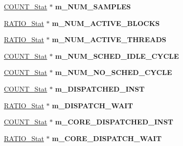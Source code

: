 \begin{DoxyCompactItemize}
\item 
\hypertarget{classall__stats__c_a894e805c8c68b2359cfa3eb3fd7ef468}{
\hyperlink{classCOUNT__Stat}{COUNT\_\-Stat} $\ast$ {\bfseries m\_\-NUM\_\-SAMPLES}}
\label{classall__stats__c_a894e805c8c68b2359cfa3eb3fd7ef468}

\item 
\hypertarget{classall__stats__c_a3366b919ccf4d52b52426aeb33c5e3c9}{
\hyperlink{classRATIO__Stat}{RATIO\_\-Stat} $\ast$ {\bfseries m\_\-NUM\_\-ACTIVE\_\-BLOCKS}}
\label{classall__stats__c_a3366b919ccf4d52b52426aeb33c5e3c9}

\item 
\hypertarget{classall__stats__c_a7de51a79b8407b4cf35d9731ea250818}{
\hyperlink{classRATIO__Stat}{RATIO\_\-Stat} $\ast$ {\bfseries m\_\-NUM\_\-ACTIVE\_\-THREADS}}
\label{classall__stats__c_a7de51a79b8407b4cf35d9731ea250818}

\item 
\hypertarget{classall__stats__c_affa7ab6f09b749f1565b200a6fcb50c7}{
\hyperlink{classCOUNT__Stat}{COUNT\_\-Stat} $\ast$ {\bfseries m\_\-NUM\_\-SCHED\_\-IDLE\_\-CYCLE}}
\label{classall__stats__c_affa7ab6f09b749f1565b200a6fcb50c7}

\item 
\hypertarget{classall__stats__c_af9ad8fe77bc707938d4768e42ca112b9}{
\hyperlink{classCOUNT__Stat}{COUNT\_\-Stat} $\ast$ {\bfseries m\_\-NUM\_\-NO\_\-SCHED\_\-CYCLE}}
\label{classall__stats__c_af9ad8fe77bc707938d4768e42ca112b9}

\item 
\hypertarget{classall__stats__c_aa653cdcc40dc5cf587ffb2170512f1ce}{
\hyperlink{classCOUNT__Stat}{COUNT\_\-Stat} $\ast$ {\bfseries m\_\-DISPATCHED\_\-INST}}
\label{classall__stats__c_aa653cdcc40dc5cf587ffb2170512f1ce}

\item 
\hypertarget{classall__stats__c_a83abd88bd85af22596fe4a88a94b78b1}{
\hyperlink{classRATIO__Stat}{RATIO\_\-Stat} $\ast$ {\bfseries m\_\-DISPATCH\_\-WAIT}}
\label{classall__stats__c_a83abd88bd85af22596fe4a88a94b78b1}

\item 
\hypertarget{classall__stats__c_ad57f858e1f9ad73662a0d534532a4272}{
\hyperlink{classCOUNT__Stat}{COUNT\_\-Stat} $\ast$ {\bfseries m\_\-CORE\_\-DISPATCHED\_\-INST}}
\label{classall__stats__c_ad57f858e1f9ad73662a0d534532a4272}

\item 
\hypertarget{classall__stats__c_afd1eb20adacdd0708e01d71952a6a306}{
\hyperlink{classRATIO__Stat}{RATIO\_\-Stat} $\ast$ {\bfseries m\_\-CORE\_\-DISPATCH\_\-WAIT}}
\label{classall__stats__c_afd1eb20adacdd0708e01d71952a6a306}


\end{DoxyCompactItemize}
